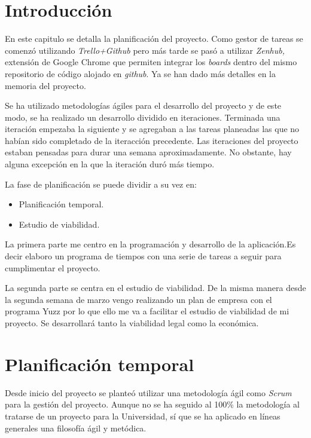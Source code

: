 
\section{Introducción}\label{introduccion-plan}
En este capitulo se detalla la planificación del proyecto. Como gestor de tareas se comenzó utilizando \emph{Trello+Github} pero más tarde se pasó a utilizar \emph{Zenhub,} extensión de Google Chrome que permiten integrar los \emph{boards} dentro del mismo repositorio de código alojado en \emph{github}. Ya se han dado más detalles en la memoria del proyecto.

Se ha utilizado metodologías ágiles para el desarrollo del proyecto y de este modo, se ha realizado un desarrollo dividido en iteraciones. Terminada una iteración empezaba la siguiente y se agregaban a las tareas planeadas las que no habían sido completado de la iteracción precedente. Las iteraciones del proyecto estaban pensadas para durar una semana aproximadamente. No obstante, hay alguna excepción en la que la iteración duró más tiempo.

La fase de planificación se puede dividir a su vez en:

\begin{itemize}
\tightlist
\item
  Planificación temporal.
\item
  Estudio de viabilidad.
\end{itemize} 

La primera parte me centro en la programación y desarrollo de la aplicación.Es decir elaboro un programa de tiempos con una serie de tareas a seguir para cumplimentar el proyecto.

La segunda parte se centra en el estudio de viabilidad. De la misma manera desde la segunda semana de marzo vengo realizando un plan de empresa con el programa Yuzz por lo que ello me va a facilitar el estudio de viabilidad de mi proyecto. Se desarrollará tanto la viabilidad legal como la económica. 


\section{Planificación temporal}\label{planificacion-temporal}
Desde inicio del proyecto se planteó utilizar una metodología ágil como
\emph{Scrum} para la gestión del proyecto. Aunque no se ha seguido al 100\% la
metodología al tratarse de un proyecto para la Universidad, sí que se ha aplicado
en líneas generales una filosofía ágil y metódica.

